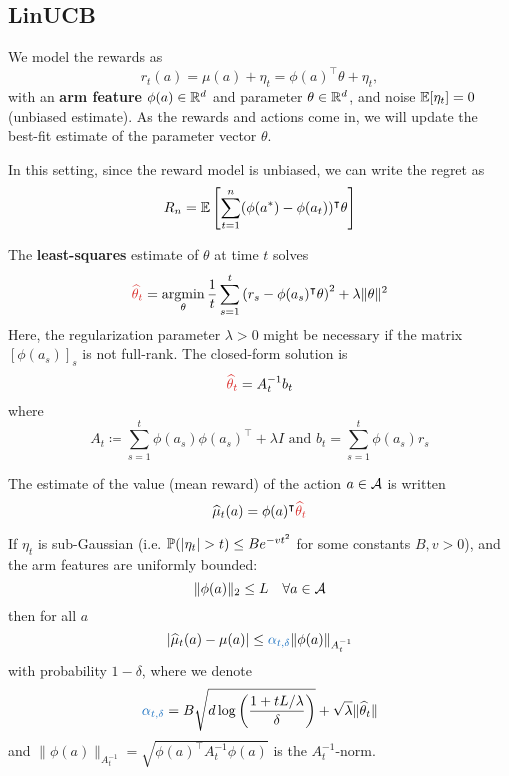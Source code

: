 \documentclass[../course-notes.tex]{subfiles}
\begin{document}
\subsection{LinUCB}


We model the rewards as
\[
	r_t(a) = \mu(a) + \eta_t = \phi(a)^\intercal \theta + \eta_t,
\]
with an \textbf{arm feature} $\phi(a) \in \mathbb{R}^d$ and parameter $\theta\in\mathbb{R}^d$, and noise $\operatorname{\mathbb{E}}[\eta_t] = 0$ (unbiased estimate). As the rewards and actions come in, we will update the best-fit estimate of the parameter vector $\theta$.

\begin{remark}
In this setting, since the reward model is unbiased, we can write the regret as
\begin{equation}
	R_n = \operatorname{\mathbb{E}}\left[
	\sum_{t=1}^n (\phi(a^*)-\phi(a_t))^\intercal \theta
	\right]
\end{equation}
\end{remark}

The \textbf{least-squares} estimate of $\theta$ at time $t$ solves
\begin{equation}\label{eq:LinUCBleastSq}
	{\redfont \widehat{\theta}_t} =
	\argmin_\theta \frac{1}{t} \sum_{s=1}^t \left(r_s - \phi(a_s)^\intercal\theta\right)^2 + \lambda \|\theta\|^2
\end{equation}
Here, the regularization parameter $\lambda > 0$ might be necessary if the matrix $[\phi(a_s)]_s$ is not full-rank. The closed-form solution is
\begin{equation}
	{\redfont\widehat{\theta}_t} = A_t^{-1} b_t
\end{equation}
where
\[
	A_t \coloneqq \sum_{s=1}^t \phi(a_s)\phi(a_s)^\intercal + \lambda I  \text{ and }
	b_t = \sum_{s=1}^t \phi(a_s) r_s
\]

The estimate of the value (mean reward) of the action $a\in\mathcal{A}$ is written
\begin{equation}
	\widehat{\mu}_t(a) = \phi(a)^\intercal {\redfont \widehat{\theta}_t}
\end{equation}

\begin{prop}
	If $\eta_t$ is sub-Gaussian (i.e. $\mathbb{P}(|\eta_t| > t) \leq Be^{-vt^2}$ for some constants $B,v>0$), and the arm features are uniformly bounded:
	\[
		\|\phi(a)\|_2 \leq L\quad \forall a\in\mathcal{A}
	\]
	then for all $a$
	\[
		\left|\widehat{\mu}_t(a) - \mu(a) \right|
		\leq {\bluefont\alpha_{t,\delta}} \| \phi(a) \|_{A_t^{-1}}
	\]
	with probability $1-\delta$, where we denote
	\begin{equation}\label{eq:LinUCBalpha}
		{\bluefont\alpha_{t,\delta}} = B \sqrt{d \log\left(\frac{1+tL/\lambda}{\delta}\right)} + \sqrt{\lambda}\|\widehat{\theta}_t\|
	\end{equation}
	and $\|\phi(a)\|_{A_t^{-1}} = \sqrt{\phi(a)^\intercal A_t^{-1}\phi(a)}$ is the $A_t^{-1}$-norm.
\end{prop}
\end{document}
